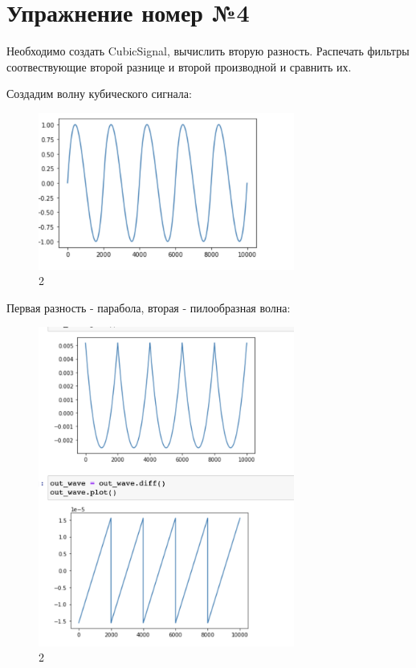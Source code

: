 \documentclass[10pt,a4paper,oneside]{article}
\begin{document}
\section{Упражнение номер №4}

Необходимо создать CubicSignal, вычислить вторую разность. Распечать фильтры соотвествующие второй разнице и второй производной и сравнить их.

Создадим волну кубического сигнала:

\begin{figure}[H]
        \centering
        \includegraphics[width=0.75\textwidth]{pics/14.png}
        \caption{2}
        \label{fig:first}
\end{figure}

Первая разность - парабола, вторая - пилообразная волна:

\begin{figure}[H]
        \centering
        \includegraphics[width=0.75\textwidth]{pics/15.png}
        \caption{2}
        \label{fig:first}
\end{figure}
\end{document}
